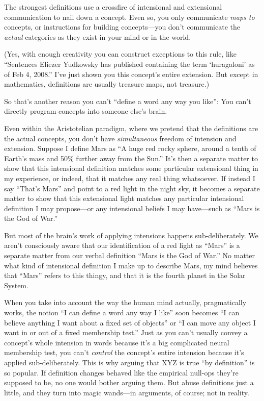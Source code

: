 { The strongest definitions use a crossfire of intensional and
extensional communication to nail down a concept. Even so, you only
communicate \textit{maps to} concepts, or instructions for building
concepts---you don't communicate the \textit{actual}
categories as they exist in your mind or in the world.


 (Yes, with enough creativity you can construct exceptions to this
rule, like ``Sentences Eliezer Yudkowsky has published
containing the term `huragaloni' as of
Feb 4, 2008.'' I've just shown you
this concept's entire extension. But except in
mathematics, definitions are usually treasure maps, not treasure.)


 So that's another reason you can't
``define a word any way you like'':
You can't directly program concepts into someone
else's brain.


 Even within the Aristotelian paradigm, where we pretend that the
definitions are the actual concepts, you don't have
\textit{simultaneous} freedom of intension and extension. Suppose I
define Mars as ``A huge red rocky sphere, around a
tenth of Earth's mass and 50\% further away from the
Sun.'' It's then a separate matter to
show that this intensional definition matches some particular
extensional thing in my experience, or indeed, that it matches any real
thing whatsoever. If instead I say
``That's Mars'' and
point to a red light in the night sky, it becomes a separate matter to
show that this extensional light matches any particular intensional
definition I may propose---or any intensional beliefs I may have---such
as ``Mars is the God of War.''


 But most of the brain's work of applying
intensions happens sub-deliberately. We aren't
consciously aware that our identification of a red light as
``Mars'' is a separate matter from
our verbal definition ``Mars is the God of
War.'' No matter what kind of intensional definition
I make up to describe Mars, my mind believes that
``Mars'' refers to this thingy, and
that it is the fourth planet in the Solar System.


 When you take into account the way the human mind actually,
pragmatically works, the notion ``I can define a word
any way I like'' soon becomes ``I
can believe anything I want about a fixed set of
objects'' or ``I can move any object
I want in or out of a fixed membership test.'' Just
as you can't usually convey a concept's
whole intension in words because it's a big complicated
neural membership test, you can't \textit{control} the
concept's entire intension because it's
applied sub-deliberately. This is why arguing that XYZ is true
``by definition'' is so popular. If
definition changes behaved like the empirical null-ops
they're supposed to be, no one would bother arguing
them. But abuse definitions just a little, and they turn into magic
wands---in arguments, of course; not in reality.

}
